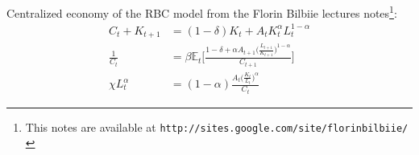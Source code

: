 \documentclass[11pt]{article}
\newcommand{\E}[1]{\mathbb{E}_{#1}}
\begin{document}
Centralized economy of the RBC model from the Florin Bilbiie lectures notes\footnote{This notes are available at \verb!http://sites.google.com/site/florinbilbiie/! }:
\begin{align}
C_t+K_{t+1}&=(1-\delta)K_t+A_tK_t^{\alpha}L_t^{1-\alpha}\\
\frac{1}{C_t}&= \beta \E{t} \Big[\frac{1-\delta+\alpha A_{t+1}\big(\frac{L_{t+1}}{K_{t+1}}\big)^{1-\alpha} }{C_{t+1}} \Big]\\
\chi L_t^{\alpha}&=(1-\alpha)\frac{A_t\big(\frac{K_{t}}{L_{t}}\big)^{\alpha}}{C_t}
\end{align}
\end{document}
